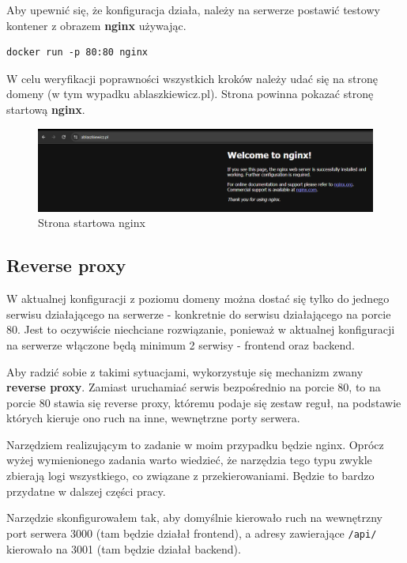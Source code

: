 \documentclass{article}
\begin{document}
Aby upewnić się, że konfiguracja działa, należy na serwerze postawić testowy kontener z obrazem \textbf{nginx} używając.

\begin{lstlisting}[caption=Komenda uruchamiająca kontener z obrazem nginx w celu przetestowania] docker run -p 80:80 nginx
\end{lstlisting}

W celu weryfikacji poprawności wszystkich kroków należy udać się na stronę domeny (w tym wypadku ablaszkiewicz.pl). Strona powinna pokazać stronę startową \textbf{nginx}.

\begin{figure}[H]
    \centering
    \includegraphics[width=1\linewidth]{ipv6helloWorld.png}
    \caption{Strona startowa nginx}
    \label{fig:enter-label}
\end{figure}


\subsection{Reverse proxy}

W aktualnej konfiguracji z poziomu domeny można dostać się tylko do jednego serwisu działającego na serwerze - konkretnie do serwisu działającego na porcie 80. Jest to oczywiście niechciane rozwiązanie, ponieważ w aktualnej konfiguracji na serwerze włączone będą minimum 2 serwisy - frontend oraz backend.

Aby radzić sobie z takimi sytuacjami, wykorzystuje się mechanizm zwany \textbf{reverse proxy}. Zamiast uruchamiać serwis bezpośrednio na porcie 80, to na porcie 80 stawia się reverse proxy, któremu podaje się zestaw reguł, na podstawie których kieruje ono ruch na inne, wewnętrzne porty serwera.

Narzędziem realizującym to zadanie w moim przypadku będzie nginx. Oprócz wyżej wymienionego zadania warto wiedzieć, że narzędzia tego typu zwykle zbierają logi wszystkiego, co związane z przekierowaniami. Będzie to bardzo przydatne w dalszej części pracy.

Narzędzie skonfigurowałem tak, aby domyślnie kierowało ruch na wewnętrzny port serwera 3000 (tam będzie działał frontend), a adresy zawierające \lstinline|/api/| kierowało na 3001 (tam będzie działał backend).
\end{document}
